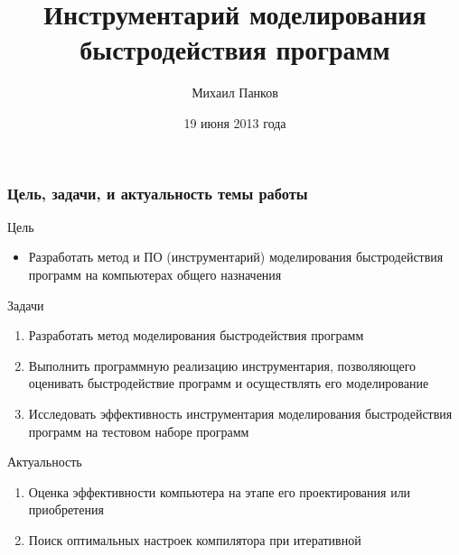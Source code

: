 \documentclass{beamer}
\title{Инструментарий моделирования быстродействия программ}
\author{Михаил Панков}
\institute{МГТУ им Н.Э.Баумана}
\date{19 июня 2013 года}
\begin{document}
\maketitle

\begin{frame}
\frametitle{Цель, задачи, и актуальность темы работы}

\begin{block}{Цель}
	\begin{itemize}
		\item Разработать метод и ПО (инструментарий) моделирования быстродействия программ на компьютерах общего назначения
	\end{itemize}
\end{block}

\begin{block}{Задачи}
	\begin{enumerate}
		\item Разработать метод моделирования быстродействия программ
		\item Выполнить программную реализацию инструментария, позволяющего оценивать быстродействие программ и осуществлять его моделирование
		\item Исследовать эффективность инструментария моделирования быстродействия программ на тестовом наборе программ
	\end{enumerate}
\end{block}

\begin{block}{Актуальность}
	\begin{enumerate}
		\item Оценка эффективности компьютера на этапе его проектирования или приобретения
		\item Поиск оптимальных настроек компилятора при итеративной
	\end{enumerate}
\end{block}

\end{frame}
\end{document}
